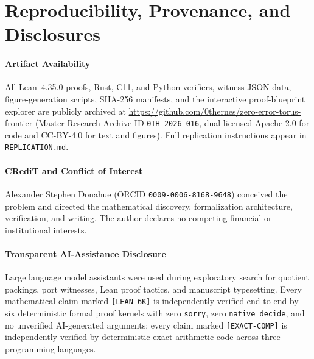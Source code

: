 \documentclass[11pt,reqno]{amsart}
\theoremstyle{definition}
\newcommand{\lean}[1]{\nolinkurl{#1}}
\begin{document}
\section{Reproducibility, Provenance, and Disclosures}\label{sec:repro}

\paragraph{\textbf{Artifact Availability}}
All Lean~4.35.0 proofs, Rust, C11, and Python verifiers, witness JSON data, figure-generation scripts, SHA-256 manifests, and the interactive proof-blueprint explorer are publicly archived at
\url{https://github.com/0thernes/zero-error-torus-frontier}
(Master Research Archive ID \texttt{0TH-2026-016}, dual-licensed Apache-2.0 for code and CC-BY-4.0 for text and figures). Full replication instructions appear in \lean{REPLICATION.md}.

\paragraph{\textbf{CRediT and Conflict of Interest}}
Alexander Stephen Donahue (ORCID \texttt{0009-0006-8168-9648}) conceived the problem and directed the mathematical discovery, formalization architecture, verification, and writing. The author declares no competing financial or institutional interests.

\paragraph{\textbf{Transparent AI-Assistance Disclosure}}
Large language model assistants were used during exploratory search for quotient packings, port witnesses, Lean proof tactics, and manuscript typesetting. Every mathematical claim marked \texttt{[LEAN-6K]} is independently verified end-to-end by six deterministic formal proof kernels with zero \texttt{sorry}, zero \texttt{native\_decide}, and no unverified AI-generated arguments; every claim marked \texttt{[EXACT-COMP]} is independently verified by deterministic exact-arithmetic code across three programming languages.



\end{document}
